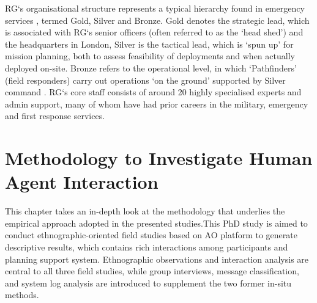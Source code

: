 \ac{RG}`s organisational structure represents a typical hierarchy found in emergency services \cite{U.S.DepartmentofHomelandSecurity2008}, termed Gold, Silver and Bronze. Gold denotes the strategic lead, which is associated with \ac{RG}`s senior officers (often referred to as the `head shed') and the headquarters in London, Silver is the tactical lead, which is `spun up' for mission planning, both to assess feasibility of deployments and when actually deployed on-site. Bronze refers to the operational level, in which `Pathfinders' (field responders) carry out operations `on the ground' supported by Silver command \cite{RescueGlobal2012}. \ac{RG}`s core staff consists of around 20 highly specialised experts and admin support, many of whom have had prior careers in the military, emergency and first response services.\\






\chapter{Methodology to Investigate Human Agent Interaction}\label{ch:methodology}
This chapter takes an in-depth look at the methodology that underlies the empirical approach adopted in the presented studies.This PhD study is aimed to conduct ethnographic-oriented field studies based on \acf{AO} platform to generate descriptive results, which contains rich interactions among participants and planning support system. Ethnographic observations and interaction analysis are central to all three field studies, while group interviews, message classification, and system log analysis are introduced to supplement the two former in-situ methods.\\

